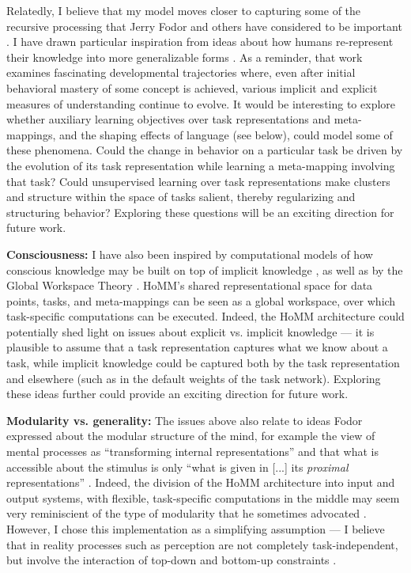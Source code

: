 Relatedly, I believe that my model moves closer to capturing some of the recursive processing that Jerry Fodor and others have considered to be important \citep[e.g.][]{Fodor2008lot2}. I have drawn particular inspiration from ideas about how humans re-represent their knowledge into more generalizable forms \citep{Karmiloff-Smith1986,Clark1993}. As a reminder, that work examines fascinating developmental trajectories where, even after initial behavioral mastery of some concept is achieved, various implicit and explicit measures of understanding continue to evolve. It would be interesting to explore whether auxiliary learning objectives over task representations and meta-mappings, and the shaping effects of language (see below), could model some of these phenomena. Could the change in behavior on a particular task be driven by the evolution of its task representation while learning a meta-mapping involving that task? Could unsupervised learning over task representations make clusters and structure within the space of tasks salient, thereby regularizing and structuring behavior? Exploring these questions will be an exciting direction for future work. \par 

\textbf{Consciousness:} I have also been inspired by computational models of how conscious knowledge may be built on top of implicit knowledge \citep{Cleeremans2014}, as well as by the Global Workspace Theory \citep{Baars2005}. HoMM's shared representational space for data points, tasks, and meta-mappings can be seen as a global workspace, over which task-specific computations can be executed. Indeed, the HoMM architecture could potentially shed light on issues about explicit vs. implicit knowledge --- it is plausible to assume that a task representation captures what we know about a task, while implicit knowledge could be captured both by the task representation and elsewhere (such as in the default weights of the task network). Exploring these ideas further could provide an exciting direction for future work. \par

\textbf{Modularity vs. generality:} The issues above also relate to ideas Fodor expressed about the modular structure of the mind, for example the view of mental processes as ``transforming internal representations'' and that what is accessible about the stimulus is only ``what is given in [...] its \emph{proximal} representations'' \citep[][pp. 200-201]{fodor1975language}. Indeed, the division of the HoMM architecture into input and output systems, with flexible, task-specific computations in the middle may seem very reminiscient of the type of modularity that he sometimes advocated \citep{Fodor1983modularity}. However, I chose this implementation as a simplifying assumption --- I believe that in reality processes such as perception are not completely task-independent, but involve the interaction of top-down and bottom-up constraints \citep{McClelland2014}. \par

